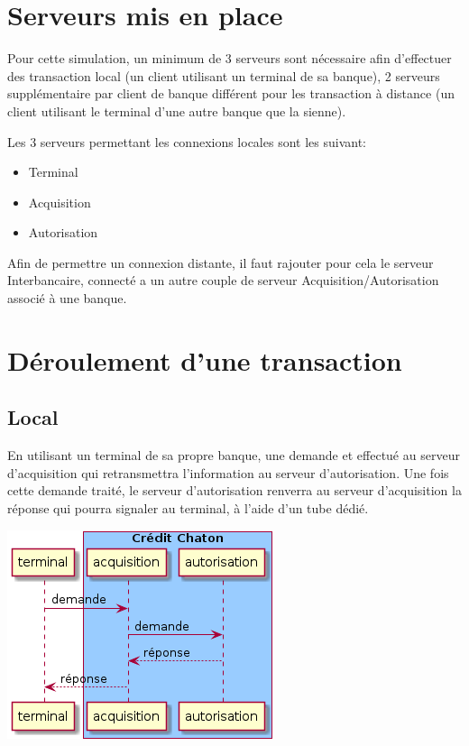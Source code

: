 \documentclass[french, a4paper, 12pt, titlepage]{article}
\begin{document}
\section{Serveurs mis en place}
Pour cette simulation, un minimum de 3 serveurs sont nécessaire afin d'effectuer des transaction local
(un client utilisant un terminal de sa banque),
2 serveurs supplémentaire par client de banque différent pour les transaction à distance (un client utilisant le terminal d'une autre banque que la sienne).

Les 3 serveurs permettant les connexions locales sont les suivant:

\begin{itemize}
\item Terminal
\item Acquisition
\item Autorisation
\end{itemize}

Afin de permettre un connexion distante, il faut rajouter pour cela le serveur Interbancaire, connecté a un autre couple de serveur Acquisition/Autorisation associé à une banque.

\section{Déroulement d'une transaction}
\subsection{Local}
En utilisant un terminal de sa propre banque, une demande et effectué au serveur d'acquisition qui retransmettra l'information au serveur d'autorisation.
Une fois cette demande traité, le serveur d'autorisation renverra au serveur d'acquisition la réponse qui pourra signaler au terminal, à l'aide d'un tube dédié.
\medskip
\begin{center}
\includegraphics[scale=0.7]{transactionLocal}
\end{center}
\medskip
\end{document}
